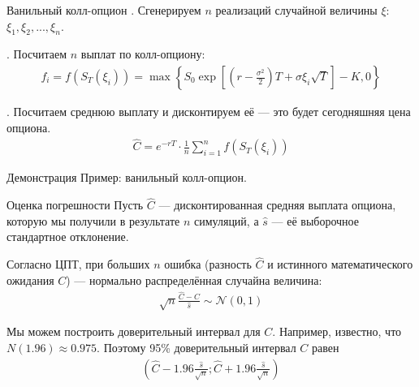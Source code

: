 \documentclass{beamer}
\begin{document}
\begin{frame}{Ванильный колл-опцион}
. Сгенерируем $n$ реализаций случайной величины $\xi$: $\xi_1, \xi_2, ..., \xi_n$. 

. Посчитаем $n$ выплат по колл-опциону:
\begin{align*}
f_i = f(S_T(\xi_i)) = \max\left\{S_0 \exp\left[\left(r - \frac{\sigma^2}{2}\right)T + \sigma\xi_i\sqrt{T}\right] - K, 0\right\}
\end{align*}

. Посчитаем среднюю выплату и дисконтируем её --- это будет сегодняшняя цена опциона.
\begin{align*}
\hat{C} = e^{-rT} \cdot \frac{1}{n}\sum\limits_{i=1}^{n}f(S_T(\xi_i))
\end{align*}
\end{frame}



\begin{frame}{Демонстрация}
\justify
Пример: ванильный колл-опцион.
\end{frame}



\begin{frame}{Оценка погрешности}
\justify
Пусть $\hat{C}$ --- дисконтированная средняя выплата 	опциона, которую мы получили в результате $n$ симуляций, а $\hat{s}$ --- её выборочное стандартное отклонение.

\justify
Согласно ЦПТ, при больших $n$ ошибка (разность $\hat{C}$ и истинного математического ожидания $C$) --- нормально распределённая случайна величина:
\begin{align*}
\sqrt{n}\frac{\hat{C} - C}{\hat{s}} \sim \mathcal{N}(0, 1)
\end{align*}

\justify
Мы можем построить доверительный интервал для $C$. Например, известно, что $N(1.96) \approx 0.975$. Поэтому 95\% доверительный интервал $C$ равен
\begin{align*}
\left(\hat{C} - 1.96\frac{\hat{s}}{\sqrt{n}}; \hat{C} + 1.96\frac{\hat{s}}{\sqrt{n}} \right)
\end{align*}  
\end{frame}
\end{document}
